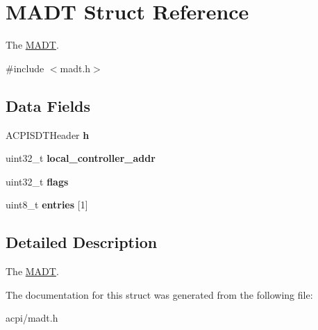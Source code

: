 \hypertarget{structMADT}{}\section{M\+A\+DT Struct Reference}
\label{structMADT}


The \hyperlink{structMADT}{M\+A\+DT}.  




{\ttfamily \#include $<$madt.\+h$>$}

\subsection*{Data Fields}
\begin{DoxyCompactItemize}
\item 
A\+C\+P\+I\+S\+D\+T\+Header {\bfseries h}\hypertarget{structMADT_a7851906252fc6f30570beb86d01e979b}{}\label{structMADT_a7851906252fc6f30570beb86d01e979b}

\item 
uint32\+\_\+t {\bfseries local\+\_\+controller\+\_\+addr}\hypertarget{structMADT_aae54cf730fb0136f75451edfda6bd7c0}{}\label{structMADT_aae54cf730fb0136f75451edfda6bd7c0}

\item 
uint32\+\_\+t {\bfseries flags}\hypertarget{structMADT_aafcaad67f1fac9ee09d0cb32a7d98141}{}\label{structMADT_aafcaad67f1fac9ee09d0cb32a7d98141}

\item 
uint8\+\_\+t {\bfseries entries} \mbox{[}1\mbox{]}\hypertarget{structMADT_a69e256b457ad380281a19a084dccadd1}{}\label{structMADT_a69e256b457ad380281a19a084dccadd1}

\end{DoxyCompactItemize}


\subsection{Detailed Description}
The \hyperlink{structMADT}{M\+A\+DT}. 

The documentation for this struct was generated from the following file\+:\begin{DoxyCompactItemize}
\item 
acpi/madt.\+h\end{DoxyCompactItemize}
